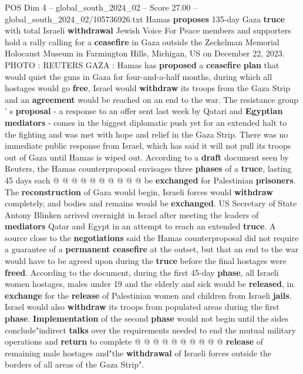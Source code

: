 \begin{textsample}{POS Dim 4 – global\_south\_2024\_02 – Score 27.00 – global\_south\_2024\_02/105736926.txt}  \label{ex:f4_pos_072}
Hamas \textbf{proposes} 135-day Gaza \textbf{truce} with total Israeli \textbf{withdrawal} Jewish Voice For Peace members and supporters hold a rally calling for a \textbf{ceasefire} in Gaza outside the Zeckelman Memorial Holocaust Museum in Farmington Hills, Michigan, US on December 22, 2023.
PHOTO : REUTERS GAZA : Hamas has \textbf{proposed} a \textbf{ceasefire} \textbf{plan} that would quiet the guns in Gaza for four-and-a-half months, during which all hostages would go \textbf{free}, Israel would \textbf{withdraw} its troops from the Gaza Strip and an \textbf{agreement} would be reached on an end to the war.
The resistance group ' s \textbf{proposal} - a response to an offer sent last week by Qatari and \textbf{Egyptian} \textbf{mediators} - comes in the biggest diplomatic push yet for an extended halt to the fighting and was met with hope and relief in the Gaza Strip.
There was no immediate public response from Israel, which has said it will not pull its troops out of Gaza until Hamas is wiped out.
According to a \textbf{draft} document seen by Reuters, the Hamas counterproposal envisages three \textbf{phases} of a \textbf{truce}, lasting 45 days each @ @ @ @ @ @ @ @ @ @ be \textbf{exchanged} for Palestinian \textbf{prisoners}.
The \textbf{reconstruction} of Gaza would begin, Israeli forces would \textbf{withdraw} completely, and bodies and remains would be \textbf{exchanged}.
US Secretary of State Antony Blinken arrived overnight in Israel after meeting the leaders of \textbf{mediators} Qatar and Egypt in an attempt to reach an extended \textbf{truce}.
A source close to the \textbf{negotiations} said the Hamas counterproposal did not require a guarantee of a \textbf{permanent} \textbf{ceasefire} at the outset, but that an end to the war would have to be agreed upon during the \textbf{truce} before the final hostages were \textbf{freed}.
According to the document, during the first 45-day \textbf{phase}, all Israeli women hostages, males under 19 and the elderly and sick would be \textbf{released}, in \textbf{exchange} for the \textbf{release} of Palestinian women and children from Israeli \textbf{jails}.
Israel would also \textbf{withdraw} its troops from populated areas during the first \textbf{phase}. \textbf{Implementation} of the second \textbf{phase} would not begin until the sides conclude"indirect \textbf{talks} over the requirements needed to end the mutual military operations and \textbf{return} to complete @ @ @ @ @ @ @ @ @ @ \textbf{release} of remaining male hostages and"the \textbf{withdrawal} of Israeli forces outside the borders of all areas of the Gaza Strip".

\end{textsample}
